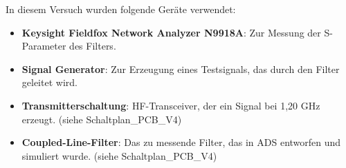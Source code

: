 In diesem Versuch wurden folgende Geräte verwendet:
\begin{itemize}
    \item \textbf{Keysight Fieldfox Network Analyzer N9918A}: Zur Messung der S-Parameter des Filters.
    \item \textbf{Signal Generator}: Zur Erzeugung eines Testsignals, das durch den Filter geleitet wird.
    \item \textbf{Transmitterschaltung}: HF-Transceiver, der ein Signal bei 1,20 GHz erzeugt. (siehe Schaltplan\_PCB\_V4)
    \item \textbf{Coupled-Line-Filter}: Das zu messende Filter, das in ADS entworfen und simuliert wurde. (siehe Schaltplan\_PCB\_V4)
\end{itemize}
\clearpage